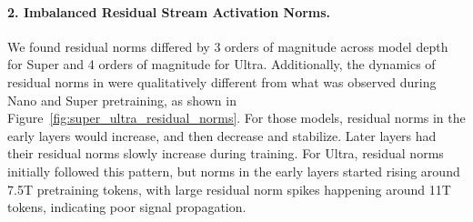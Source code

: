 \paragraph{2. Imbalanced Residual Stream Activation Norms.} We found residual norms differed by 3 orders of magnitude across model depth for Super and 4 orders of magnitude for Ultra. Additionally, the dynamics of residual norms in \ourmodel were qualitatively different from what was observed during Nano and Super pretraining, as shown in Figure~\ref{fig:super_ultra_residual_norms}. For those models, residual norms in the early layers would increase, and then decrease and stabilize. Later layers had their residual norms slowly increase during training. For Ultra, residual norms initially followed this pattern, but norms in the early layers started rising around 7.5T pretraining tokens, with large residual norm spikes happening around 11T tokens, indicating poor signal propagation.


